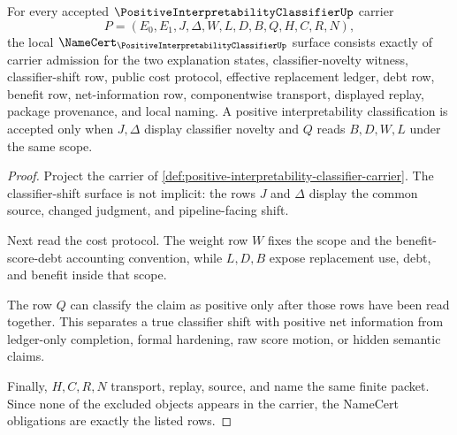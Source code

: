 \begin{theorem}
\label{thm:positive-interpretability-classifier-namecert-obligations}
For every accepted $\PositiveInterpretabilityClassifierUp$ carrier
$$
P=(E_0,E_1,J,\Delta,W,L,D,B,Q,H,C,R,N),
$$
the local $\NameCert_{\PositiveInterpretabilityClassifierUp}$ surface consists exactly of carrier admission for the two explanation states, classifier-novelty witness, classifier-shift row, public cost protocol, effective replacement ledger, debt row, benefit row, net-information row, componentwise transport, displayed replay, package provenance, and local naming. A positive interpretability classification is accepted only when $J,\Delta$ display classifier novelty and $Q$ reads $B,D,W,L$ under the same scope.
\end{theorem}
\begin{proof}
Project the carrier of \autoref{def:positive-interpretability-classifier-carrier}. The classifier-shift surface is not implicit: the rows $J$ and $\Delta$ display the common source, changed judgment, and pipeline-facing shift.

Next read the cost protocol. The weight row $W$ fixes the scope and the benefit-score-debt accounting convention, while $L,D,B$ expose replacement use, debt, and benefit inside that scope.

The row $Q$ can classify the claim as positive only after those rows have been read together. This separates a true classifier shift with positive net information from ledger-only completion, formal hardening, raw score motion, or hidden semantic claims.

Finally, $H,C,R,N$ transport, replay, source, and name the same finite packet. Since none of the excluded objects appears in the carrier, the NameCert obligations are exactly the listed rows.
\end{proof}

